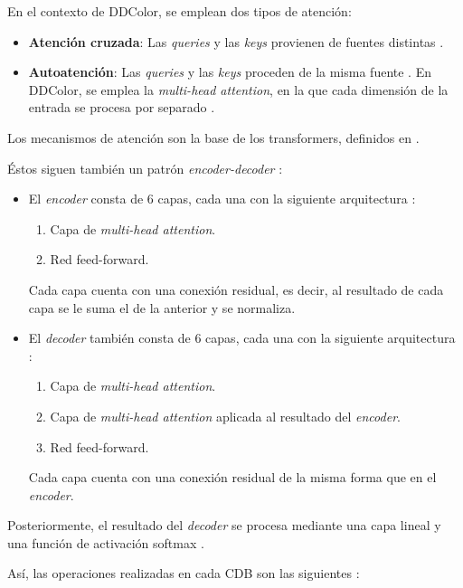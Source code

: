 \documentclass[a4paper]{article}
\begin{document}
En el contexto de DDColor, se emplean dos tipos de atención:

\begin{itemize}
  \item{\textbf{Atención cruzada}: Las \textit{queries} y las \textit{keys} provienen de fuentes distintas \cite{IBMAttention}.}
  \item{\textbf{Autoatención}: Las \textit{queries} y las \textit{keys} proceden de la misma fuente \cite{IBMAttention}. En DDColor, se emplea la \textit{multi-head attention}, en la que cada dimensión de la entrada se procesa por separado \cite{Attention}.}
\end{itemize}

Los mecanismos de atención son la base de los transformers, definidos en \cite{Attention}.

Éstos siguen también un patrón \textit{encoder-decoder} \cite{Attention}:

\begin{itemize}
  \item{El \textit{encoder} consta de 6 capas, cada una con la siguiente arquitectura \cite{Attention}:
    \begin{enumerate}
      \item{Capa de \textit{multi-head attention}.}
      \item{Red feed-forward.}
    \end{enumerate}
    Cada capa cuenta con una conexión residual, es decir, al resultado de cada capa se le suma el de la anterior y se normaliza.
  }
  \item{El \textit{decoder} también consta de 6 capas, cada una con la siguiente arquitectura \cite{Attention}:
    \begin{enumerate}
      \item{Capa de \textit{multi-head attention}.}
      \item{Capa de \textit{multi-head attention} aplicada al resultado del \textit{encoder}.}
      \item{Red feed-forward.}
    \end{enumerate}
    Cada capa cuenta con una conexión residual de la misma forma que en el \textit{encoder}.
  }
\end{itemize}

Posteriormente, el resultado del \textit{decoder} se procesa mediante una capa lineal y una función de activación softmax \cite{Softmax}.

Así, las operaciones realizadas en cada CDB son las siguientes \cite{DDColor}:
\end{document}
